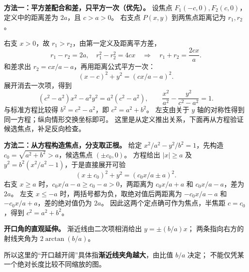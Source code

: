 \begin{proofbox}
\textbf{方法一：平方差配合和差，只平方一次（优先）。}
设焦点 $F_1(-c,0),F_2(c,0)$，定义中的距离差为 $2a$，且 $c>a>0$。
右支点 $P(x,y)$ 到两焦点距离记为 $r_1,r_2$。

右支 $x>0$，故 $r_1>r_2$，由第一定义及距离平方差，
\[
 r_1-r_2=2a,\quad r_1^2-r_2^2=4cx
 \quad\Longrightarrow\quad r_1+r_2=\frac{2cx}{a}.
\]
和差求出 $r_2=cx/a-a$，再用距离公式平方一次：
\[
 (x-c)^2+y^2=(cx/a-a)^2.
\]
展开消去一次项，得到
\[
 (c^2-a^2)x^2-a^2y^2=a^2(c^2-a^2),\qquad
 \frac{x^2}{a^2}-\frac{y^2}{c^2-a^2}=1.
\]
与标准方程比较得 $b^2=c^2-a^2$，即 $c^2=a^2+b^2$。
左支由关于 $y$ 轴的对称性得到同一方程；纵向情形交换坐标即可。
这里是从定义推出关系，下面再从方程验证候选焦点，补足反向检查。
\end{proofbox}
\clearpage
\begin{proofbox}
\textbf{方法二：从方程构造焦点，分支取正根。}
给定 $x^2/a^2-y^2/b^2=1$，先构造 $c_0=\sqrt{a^2+b^2}>a$，候选焦点 $(\pm c_0,0)$。
方程给出 $|x|\ge a$ 及 $y^2=b^2(x^2/a^2-1)$，于是直接展开可验
\[
 (x\pm c_0)^2+y^2=(c_0x/a\pm a)^2.
\]
右支 $x\ge a$ 时，$c_0x/a-a\ge c_0-a>0$，两距离为
$c_0x/a+a$ 和 $c_0x/a-a$，差为 $2a$。
左支 $x\le-a$ 时，两括号都为负，取绝对值后两距离为
$-c_0x/a-a$ 和 $-c_0x/a+a$，差的绝对值仍为 $2a$。
因此这两个定点确可作为焦点，半焦距 $c=c_0$，得到 $c^2=a^2+b^2$。

\medskip
\textbf{开口角的直观延伸。} 渐近线由二次项相消给出 $y=\pm(b/a)x$；
两条指向右方的射线夹角为 $2\arctan(b/a)$。

所以这里的“开口越开阔”具体指\textbf{渐近线夹角越大}，由比值 $b/a$ 决定；
不能仅凭某一个绝对长度比较不同缩放的图。
\end{proofbox}
\clearpage
